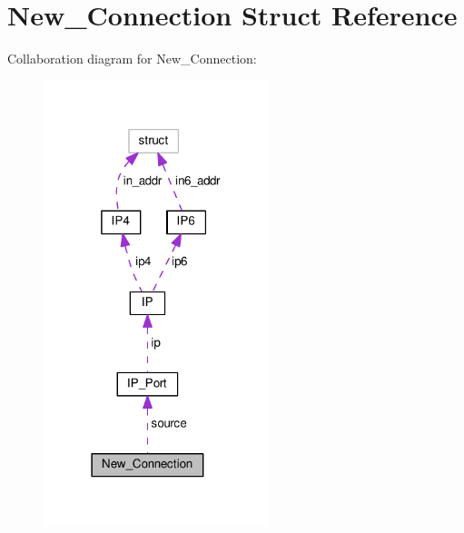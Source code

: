 \hypertarget{struct_new___connection}{\section{New\+\_\+\+Connection Struct Reference}
\label{struct_new___connection}
}


Collaboration diagram for New\+\_\+\+Connection\+:
\nopagebreak
\begin{figure}[H]
\begin{center}
\leavevmode
\includegraphics[width=186pt]{struct_new___connection__coll__graph}
\end{center}
\end{figure}

